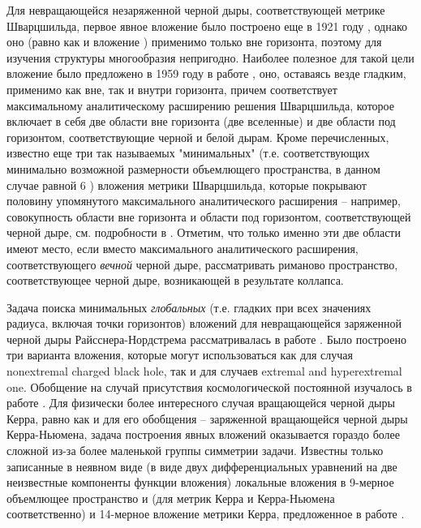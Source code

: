 \documentclass[12pt]{article}
\begin{document}
Для невращающейся незаряженной черной дыры, соответствующей метрике Шварцшильда, первое явное вложение было построено еще в 1921 году \cite{kasner3},
однако оно (равно как и вложение \cite{fudjitani}) применимо только вне горизонта, поэтому для изучения структуры многообразия непригодно.
Наиболее полезное для такой цели вложение было предложено в 1959 году в работе \cite{frons}, оно, оставаясь везде гладким, применимо
как вне, так и внутри горизонта, причем соответствует максимальному аналитическому расширению решения Шварцшильда,
которое включает в себя две области вне горизонта (две вселенные) и две области под горизонтом, соответствующие черной и белой дырам.
Кроме перечисленных, известно еще три так называемых "минимальных"{} (т.е. соответствующих минимально возможной размерности
объемлющего пространства, в данном случае равной 6 \cite{kasner2}) вложения \cite{davidson,statja27} метрики Шварцшильда, которые покрывают
половину упомянутого максимального аналитического расширения -- например, совокупность области вне горизонта и области под горизонтом, соответствующей черной дыре,
см. подробности в \cite{statja27}.
Отметим, что только именно эти две области имеют место, если вместо максимального аналитического расширения, соответствующего \emph{вечной}
черной дыре, рассматривать риманово пространство, соответствующее черной дыре, возникающей в результате коллапса.

Задача поиска минимальных \emph{глобальных} (т.е. гладких при всех значениях радиуса, включая точки горизонтов)
вложений для невращающейся заряженной черной дыры Райсснера-Нордстрема рассматривалась в работе \cite{statja30}.
Было построено три варианта вложения, которые могут использоваться как для случая nonextremal charged black hole,
так и для случаев extremal and hyperextremal one. Обобщение на случай присутствия космологической постоянной изучалось в  работе \cite{statja40}.
Для физически более интересного случая вращающейся черной дыры Керра, равно как и для его обобщения -- заряженной вращающейся черной дыры Керра-Ньюмена,
задача построения явных вложений оказывается гораздо более сложной из-за более маленькой группы симметрии задачи.
Известны только записанные в неявном виде (в виде двух дифференциальных уравнений на две неизвестные компоненты функции вложения)
локальные вложения в 9-мерное объемлющее пространство \cite{kuzeev} и \cite{kuzeevRN} (для метрик Керра и Керра-Ньюмена соответственно)
и 14-мерное вложение метрики Керра, предложенное в работе \cite{gr-qc/0503079}.
\end{document}
